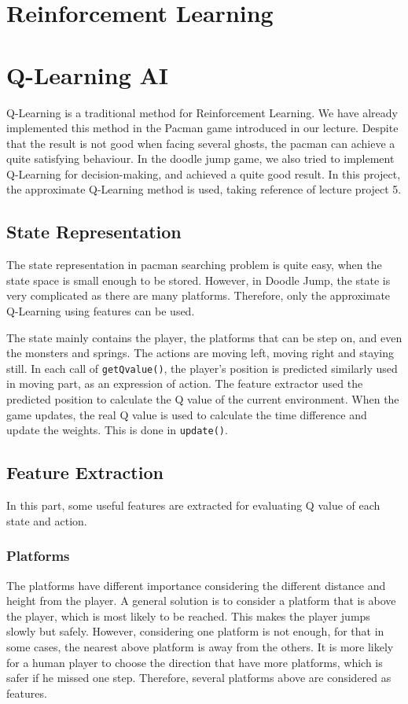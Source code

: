 \documentclass[final]{cvpr}
\begin{document}
\section{Reinforcement Learning}



\section{Q-Learning AI}
Q-Learning is a traditional method for Reinforcement Learning. 
We have already implemented this method in the Pacman game introduced in our lecture.
Despite that the result is not good when facing several ghosts, the pacman can achieve a quite satisfying behaviour.
In the doodle jump game, we also tried to implement Q-Learning for decision-making, and achieved a quite good result.
In this project, the approximate Q-Learning method is used, taking reference of lecture project 5.
\subsection{State Representation}
The state representation in pacman searching problem is quite easy, when the state space is small enough to be stored.
However, in Doodle Jump, the state is very complicated as there are many platforms.
Therefore, only the approximate Q-Learning using features can be used.

The state mainly contains the player, the platforms that can be step on, and even the monsters and springs.
The actions are moving left, moving right and staying still. In each call of \verb|getQvalue()|, 
the player's position is predicted similarly used in moving part, as an expression of action.
The feature extractor used the predicted position to calculate the Q value of the current environment.
When the game updates, the real Q value is used to calculate the time difference and update the weights.
This is done in \verb|update()|.

\subsection{Feature Extraction}
In this part, some useful features are extracted for evaluating Q value of each state and action.

\subsubsection{Platforms}
   The platforms have different importance considering the different distance and height from the player.
   A general solution is to consider a platform that is above the player, which is most likely to be reached.
   This makes the player jumps slowly but safely.
   However, considering one platform is not enough, for that in some cases, the nearest above platform is away from the others.
   It is more likely for a human player to choose the direction that have more platforms, which is safer if he missed one step.
   Therefore, several platforms above are considered as features.
\end{document}
